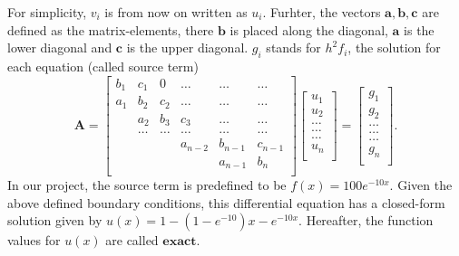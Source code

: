 \documentclass[%
oneside,                 %
final,                   %
10pt]{article}
\begin{document}
For simplicity, $v_i$ is from now on written as $u_i$.
Furhter, the vectors $ \mathbf{a}, \mathbf{b}, \mathbf{c}$ are defined as the matrix-elements, there $ \mathbf{b}$ is placed along the diagonal, $\mathbf{a}$ is the lower diagonal and $\mathbf{c}$ is the upper diagonal. $g_i$ stands for $h^2f_i$, the solution for each equation (called source term) \\
\[
    \mathbf{A} = \begin{bmatrix}
                           b_1& c_1 & 0 &\dots   & \dots &\dots \\
                           a_1 & b_2 & c_2 &\dots &\dots &\dots \\
                           & a_2 & b_3 & c_3 & \dots & \dots \\
                           & \dots   & \dots &\dots   &\dots & \dots \\
                           &   &  &a_{n-2}  &b_{n-1}& c_{n-1} \\
                           &    &  &   &a_{n-1} & b_n \\
                      \end{bmatrix}\begin{bmatrix}
                           u_1\\
                           u_2\\
                           \dots \\
                          \dots  \\
                          \dots \\
                           u_n\\
                      \end{bmatrix}
  =\begin{bmatrix}
                           g_1\\
                           g_2\\
                           \dots \\
                           \dots \\
                          \dots \\
                           g_n\\
                      \end{bmatrix}.
\]
In our project, the source term is predefined to be $f(x) = 100e^{-10x}$. Given the above defined boundary conditions, this differential equation has a closed-form solution given by $u(x) = 1 - (1-e^{-10})x -e^{-10x}$. Hereafter, the function values for $u(x)$ are called $\mathbf{exact}$.
 
\end{document}
